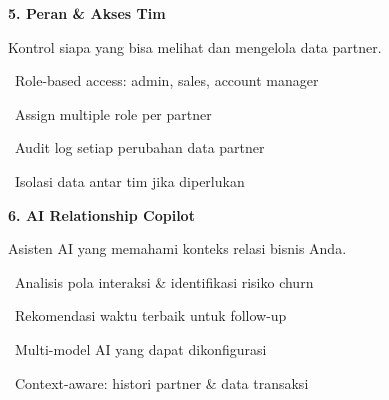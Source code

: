\documentclass[a4paper]{article}
\begin{document}
\vspace{8pt}

\noindent
\begin{minipage}[t]{0.485\textwidth}
    \colorbox{OrangePrimary}{%
        \begin{minipage}{\dimexpr\textwidth-2\fboxsep\relax}
            {\fontsize{10}{13}\selectfont\bfseries\color{White} 5. Peran \& Akses Tim}
        \end{minipage}}\par
    \vspace{4pt}
    {\fontsize{9}{12}\selectfont\color{TextDark}%
    Kontrol siapa yang bisa melihat dan mengelola data partner.\par\vspace{3pt}
    \textbullet\ Role-based access: admin, sales, account manager\par\vspace{2pt}%
    \textbullet\ Assign multiple role per partner\par\vspace{2pt}%
    \textbullet\ Audit log setiap perubahan data partner\par\vspace{2pt}%
    \textbullet\ Isolasi data antar tim jika diperlukan}%
\end{minipage}%
\hfill
\begin{minipage}[t]{0.485\textwidth}
    \colorbox{EmeraldPrimary}{%
        \begin{minipage}{\dimexpr\textwidth-2\fboxsep\relax}
            {\fontsize{10}{13}\selectfont\bfseries\color{White} 6. AI Relationship Copilot}
        \end{minipage}}\par
    \vspace{4pt}
    {\fontsize{9}{12}\selectfont\color{TextDark}%
    Asisten AI yang memahami konteks relasi bisnis Anda.\par\vspace{3pt}
    \textbullet\ Analisis pola interaksi \& identifikasi risiko churn\par\vspace{2pt}%
    \textbullet\ Rekomendasi waktu terbaik untuk follow-up\par\vspace{2pt}%
    \textbullet\ Multi-model AI yang dapat dikonfigurasi\par\vspace{2pt}%
    \textbullet\ Context-aware: histori partner \& data transaksi}%
\end{minipage}
\end{document}
